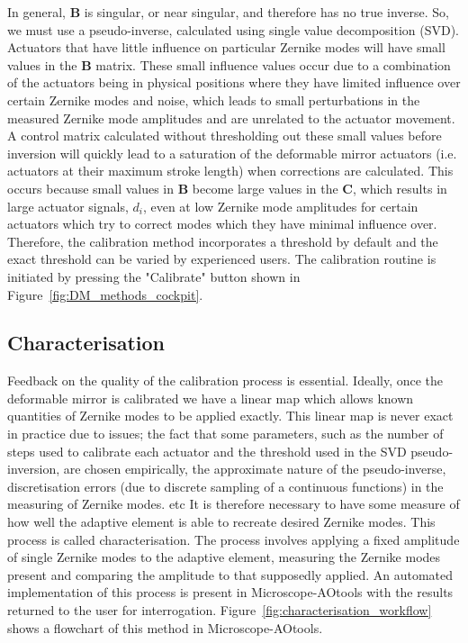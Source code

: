 In general, $\boldsymbol{B}$ is singular, or near singular, and therefore has 
no true inverse. So, we must use a pseudo-inverse, calculated using single 
value decomposition (SVD). Actuators that have little influence on particular 
Zernike modes will have small values in the $\boldsymbol{B}$ matrix. These 
small influence values occur due to a combination of the actuators being in 
physical positions where they have limited influence over certain Zernike 
modes and noise, which leads to small perturbations in the measured Zernike 
mode amplitudes and are unrelated to the actuator movement. A control matrix 
calculated without thresholding out these small values before inversion will 
quickly lead to a saturation of the deformable mirror  actuators (i.e. 
actuators at their maximum stroke length) when corrections are 
calculated\cite{booth2005methods}. This occurs because small values in 
$\boldsymbol{B}$ become large values in the $\boldsymbol{C}$, which results 
in large actuator signals, $d_{i}$, even at low Zernike mode amplitudes for 
certain actuators which try to correct modes which they have minimal 
influence over. Therefore, the calibration method incorporates a threshold by 
default and the exact threshold can be varied by experienced users. The 
calibration routine is initiated by pressing the "Calibrate" button shown in 
Figure~\ref{fig:DM_methods_cockpit}.

\subsection{Characterisation}
\label{subsec:characterisation}

Feedback on the quality of the calibration process is essential. Ideally, once the deformable mirror is calibrated we have a linear map which allows known quantities of Zernike modes to be applied exactly. This linear map is never exact in practice due to issues; the fact that some parameters, such as the number of steps used to calibrate each actuator and the threshold used in the SVD pseudo-inversion, are chosen empirically, the approximate nature of the pseudo-inverse, discretisation errors (due to discrete sampling of a continuous functions) in the measuring of Zernike modes. etc It is therefore necessary to have some measure of how well the adaptive element is able to recreate desired Zernike modes. This process is called characterisation. The process involves applying a fixed amplitude of single Zernike modes to the adaptive element, measuring the Zernike modes present and comparing the amplitude to that supposedly applied. An automated implementation of this process is present in Microscope-AOtools with the results returned to the user for interrogation. Figure~\ref{fig:characterisation_workflow} shows a flowchart of this method in Microscope-AOtools. 

